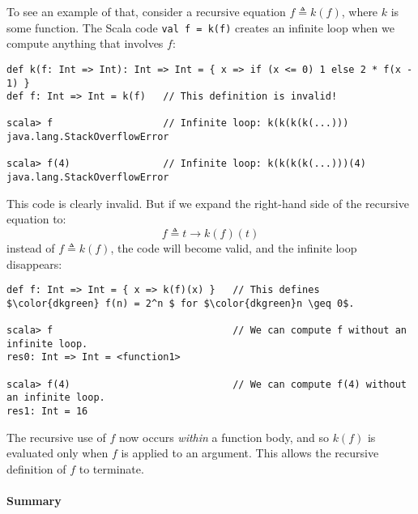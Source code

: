 To see an example of that, consider a recursive equation $f\triangleq k(f)$,
where $k$ is some function. The Scala code \lstinline!val f = k(f)!
creates an infinite loop when we compute anything that involves $f$:
\begin{lstlisting}[mathescape=true]
def k(f: Int => Int): Int => Int = { x => if (x <= 0) 1 else 2 * f(x - 1) }
def f: Int => Int = k(f)   // This definition is invalid!

scala> f                   // Infinite loop: k(k(k(k(...)))
java.lang.StackOverflowError

scala> f(4)                // Infinite loop: k(k(k(k(...)))(4)
java.lang.StackOverflowError
\end{lstlisting}
This code is clearly invalid. But if we expand the right-hand side
of the recursive equation to:
\[
f\triangleq t\rightarrow k(f)(t)
\]
instead of $f\triangleq k(f)$, the code will become valid, and the
infinite loop disappears:
\begin{lstlisting}[mathescape=true]
def f: Int => Int = { x => k(f)(x) }   // This defines $\color{dkgreen} f(n) = 2^n $ for $\color{dkgreen}n \geq 0$.

scala> f                               // We can compute f without an infinite loop.
res0: Int => Int = <function1>

scala> f(4)                            // We can compute f(4) without an infinite loop.
res1: Int = 16
\end{lstlisting}
The recursive use of $f$ now occurs \emph{within} a function body,
and so $k(f)$ is evaluated only when $f$ is applied to an argument.
This allows the recursive definition of $f$ to terminate.

\paragraph{Summary}


